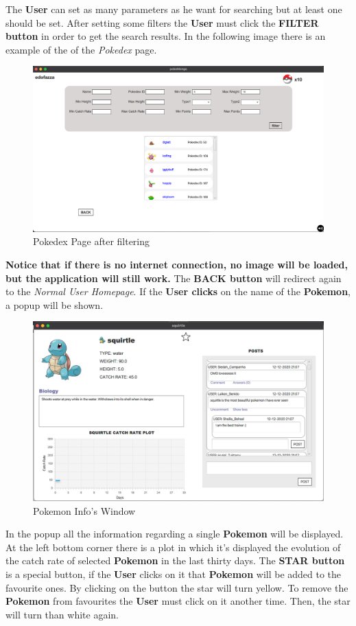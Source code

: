 The \textbf{User} can set as many parameters as he want for searching but at least one should be set. After setting some filters the \textbf{User} must click the \textbf{FILTER button} in order to get the search results. In the following image there is an example of the  of the \textit{Pokedex} page.
\begin{figure}[H]
	\centering
	\includegraphics[width=\textwidth]{img/userManual/pokedex2.png}
	\caption{Pokedex Page after filtering}
\end{figure}
\textbf{Notice that if there is no internet connection, no image will be loaded, but the application will still work.} The \textbf{BACK button} will redirect again to the \textit{Normal User Homepage}. If the \textbf{User clicks} on the name of the \textbf{Pokemon}, a popup will be shown. 
\begin{figure}[H]
	\centering
	\includegraphics[width=\textwidth]{img/userManual/pokemon_info.png}
	\caption{Pokemon Info's Window}
\end{figure}
In the popup all the information regarding a single \textbf{Pokemon} will be displayed. At the left bottom corner there is a plot in which it’s displayed the evolution of the catch rate of selected \textbf{Pokemon} in the last thirty days. The \textbf{STAR button} is a special button, if the \textbf{User} clicks on it that \textbf{Pokemon} will be added to the favourite ones. By clicking on the button the star will turn yellow. To remove the \textbf{Pokemon} from favourites the \textbf{User} must click on it another time. Then, the star will turn than white again.\\
